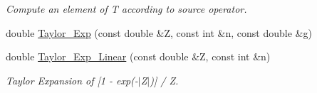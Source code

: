 \begin{DoxyCompactItemize}
\begin{DoxyCompactList}\small\item\em Compute an element of T according to source operator. \end{DoxyCompactList}\item 
double \mbox{\hyperlink{classforte_1_1_m_c_s_r_g_p_t2___m_o_a4a7b7d01659b380e0c790d440d9c8588}{Taylor\+\_\+\+Exp}} (const double \&Z, const int \&n, const double \&g)
\item 
double \mbox{\hyperlink{classforte_1_1_m_c_s_r_g_p_t2___m_o_afa94ebf067f0670291d880a1bff7c747}{Taylor\+\_\+\+Exp\+\_\+\+Linear}} (const double \&Z, const int \&n)
\begin{DoxyCompactList}\small\item\em Taylor Expansion of \mbox{[}1 -\/ exp(-\/$\vert$\+Z$\vert$)\mbox{]} / Z. \end{DoxyCompactList}\end{DoxyCompactItemize}
